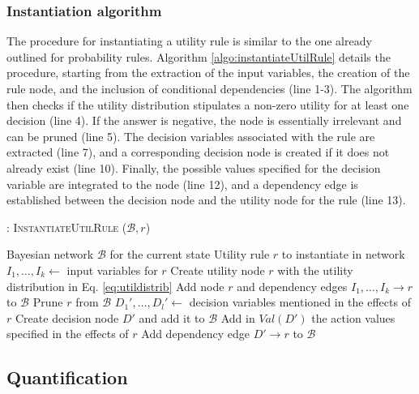 \subsubsection*{Instantiation algorithm} 

The procedure for instantiating a utility rule is similar to the one already outlined for probability rules. Algorithm \ref{algo:instantiateUtilRule} details the procedure, starting from the extraction of the input variables, the creation of the rule node, and the inclusion of conditional dependencies (line 1-3). The algorithm then checks if the utility distribution stipulates a non-zero utility for at least one decision (line 4).  If the answer is negative, the node is essentially irrelevant and can be pruned (line 5).  The decision variables associated with the rule are extracted (line 7), and a corresponding decision node is created if it does not already exist (line 10). Finally, the possible values specified for the decision variable are integrated to the node (line 12), and a dependency edge is established between the decision node and the utility node for the rule (line 13). 

\begin{algorithm}[h!]
\caption{: \textsc{InstantiateUtilRule} ($\mathcal{B}, \mathit{r}$)}
\begin{algorithmic}[1] \vspace{1mm}
\REQUIRE Bayesian network $\mathcal{B}$ for the current state
\REQUIRE Utility rule $\mathit{r}$ to instantiate in network  \vspace{1mm}
\STATE $I_1, \dots, I_k \leftarrow $ input variables for $r$
\STATE Create utility node $r$ with the utility distribution in Eq. \eqref{eq:utildistrib}
\STATE Add node $r$ and dependency edges $I_1, \dots, I_k \rightarrow r$ to $\mathcal{B}$ 
\STATE Prune $r$ from $\mathcal{B}$
\ELSE
\STATE $D_1', \dots, D_l' \leftarrow$ decision variables mentioned in the effects of $r$
\STATE Create decision node $D'$ and add it to $\mathcal{B}$
\ENDIF
\STATE Add in $\mathit{Val}(D')$ the action values specified in the effects of $r$
\STATE Add dependency edge $D' \rightarrow r$ to $\mathcal{B}$ 
\ENDFOR
\ENDIF
\end{algorithmic}
\label{algo:instantiateUtilRule}
\end{algorithm}

\subsection{Quantification}
\label{sec:applicationquantif}

